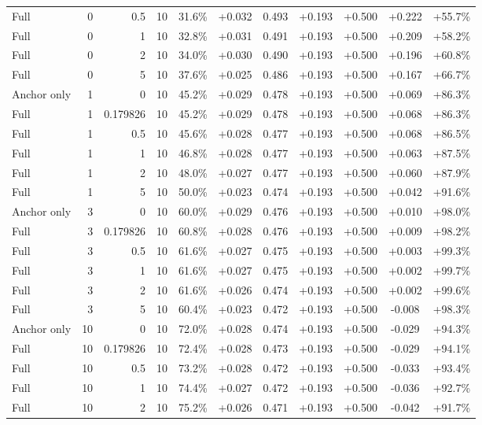 \begin{table}[htbp]
\begin{tabular}{lrrrccccccc}
Full & 0 & 0.5 & 10 & 31.6\% & +0.032 & 0.493 & +0.193 & +0.500 & +0.222 & +55.7\% \\
Full & 0 & 1 & 10 & 32.8\% & +0.031 & 0.491 & +0.193 & +0.500 & +0.209 & +58.2\% \\
Full & 0 & 2 & 10 & 34.0\% & +0.030 & 0.490 & +0.193 & +0.500 & +0.196 & +60.8\% \\
Full & 0 & 5 & 10 & 37.6\% & +0.025 & 0.486 & +0.193 & +0.500 & +0.167 & +66.7\% \\
Anchor only & 1 & 0 & 10 & 45.2\% & +0.029 & 0.478 & +0.193 & +0.500 & +0.069 & +86.3\% \\
Full & 1 & 0.179826 & 10 & 45.2\% & +0.029 & 0.478 & +0.193 & +0.500 & +0.068 & +86.3\% \\
Full & 1 & 0.5 & 10 & 45.6\% & +0.028 & 0.477 & +0.193 & +0.500 & +0.068 & +86.5\% \\
Full & 1 & 1 & 10 & 46.8\% & +0.028 & 0.477 & +0.193 & +0.500 & +0.063 & +87.5\% \\
Full & 1 & 2 & 10 & 48.0\% & +0.027 & 0.477 & +0.193 & +0.500 & +0.060 & +87.9\% \\
Full & 1 & 5 & 10 & 50.0\% & +0.023 & 0.474 & +0.193 & +0.500 & +0.042 & +91.6\% \\
Anchor only & 3 & 0 & 10 & 60.0\% & +0.029 & 0.476 & +0.193 & +0.500 & +0.010 & +98.0\% \\
Full & 3 & 0.179826 & 10 & 60.8\% & +0.028 & 0.476 & +0.193 & +0.500 & +0.009 & +98.2\% \\
Full & 3 & 0.5 & 10 & 61.6\% & +0.027 & 0.475 & +0.193 & +0.500 & +0.003 & +99.3\% \\
Full & 3 & 1 & 10 & 61.6\% & +0.027 & 0.475 & +0.193 & +0.500 & +0.002 & +99.7\% \\
Full & 3 & 2 & 10 & 61.6\% & +0.026 & 0.474 & +0.193 & +0.500 & +0.002 & +99.6\% \\
Full & 3 & 5 & 10 & 60.4\% & +0.023 & 0.472 & +0.193 & +0.500 & -0.008 & +98.3\% \\
Anchor only & 10 & 0 & 10 & 72.0\% & +0.028 & 0.474 & +0.193 & +0.500 & -0.029 & +94.3\% \\
Full & 10 & 0.179826 & 10 & 72.4\% & +0.028 & 0.473 & +0.193 & +0.500 & -0.029 & +94.1\% \\
Full & 10 & 0.5 & 10 & 73.2\% & +0.028 & 0.472 & +0.193 & +0.500 & -0.033 & +93.4\% \\
Full & 10 & 1 & 10 & 74.4\% & +0.027 & 0.472 & +0.193 & +0.500 & -0.036 & +92.7\% \\
Full & 10 & 2 & 10 & 75.2\% & +0.026 & 0.471 & +0.193 & +0.500 & -0.042 & +91.7\% \\

\end{tabular}
\end{table}

